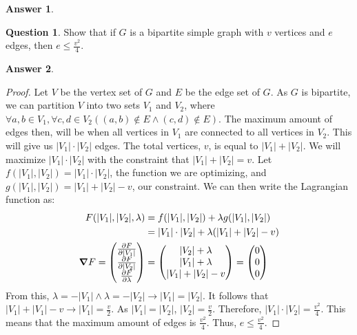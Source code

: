 \documentclass[article, 12pt]{article}
\theoremstyle{definition}
\newtheorem{question}{Question}
\newtheorem{answer}{Answer}
\begin{document}
    \begin{answer}
    \end{answer}

    \begin{question}
        Show that if $G$ is a bipartite simple graph with $v$ vertices and $e$ edges, then $e \leq \frac{v^2}4$.
    \end{question}

    \begin{answer}
        \begin{proof}
            Let $V$ be the vertex set of $G$ and $E$ be the edge set of $G$. As $G$ is bipartite, we can partition $V$ into two sets $V_1$ and $V_2$, where $\forall a,b \in V_1, \forall c,d \in V_2 ((a,b) \not\in E \land (c,d) \not\in E)$. The maximum amount of edges then, will be when all vertices in $V_1$ are connected to all vertices in $V_2$. This will give us $|V_1| \cdot |V_2|$ edges. The total vertices, $v$, is equal to $|V_1| + |V_2|$. We will maximize $|V_1| \cdot |V_2|$ with the constraint that $|V_1| + |V_2| = v$. Let $f(|V_1|,|V_2|) = |V_1| \cdot |V_2|$, the function we are optimizing, and $g(|V_1|,|V_2|) = |V_1| + |V_2| - v$, our constraint. We can then write the Lagrangian function as:
            \begin{align*}
                F(|V_1|,|V_2|,\lambda) &= f(|V_1|,|V_2|) + \lambda g(|V_1|,|V_2|) \\
                               &= |V_1| \cdot |V_2| + \lambda(|V_1| + |V_2| - v) \\
                \grad F        = \begin{pmatrix}
                    \frac{\partial F}{\partial |V_1|} \\
                    \frac{\partial F}{\partial |V_2|} \\
                    \frac{\partial F}{\partial \lambda}
                \end{pmatrix} 
                &= \begin{pmatrix}
                    |V_2| + \lambda \\
                    |V_1| + \lambda \\
                    |V_1| + |V_2| - v
                \end{pmatrix} = \begin{pmatrix}
                    0 \\ 
                    0 \\ 
                    0
                \end{pmatrix}
            \end{align*}
            From this, $\lambda = -|V_1| \land \lambda = -|V_2| \to |V_1| = |V_2|$. It follows that $|V_1| + |V_1| - v \to |V_1| = \frac{v}{2}$. As $|V_1| = |V_2|$, $|V_2| = \frac{v}{2}$. Therefore, $|V_1| \cdot |V_2| = \frac{v^2}{4}$. This means that the maximum amount of edges is $\frac{v^2}{4}$. Thus, $e \leq \frac{v^2}{4}$.
        \end{proof}
    \end{answer}
\end{document}
